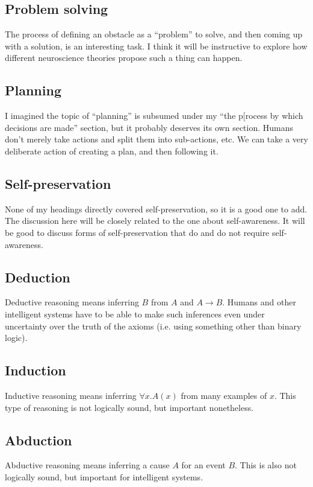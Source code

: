 \documentclass[10pt,a4paper]{article}
\newcommand{\nquote}[1]{``{#1}''}
\begin{document}
\subsection{Problem solving}
The process of defining an obstacle as a \nquote{problem} to solve, and then coming up with a solution, is an interesting task. I think it will be instructive to explore how different neuroscience theories propose such a thing can happen.

\subsection{Planning}
I imagined the topic of \nquote{planning} is subsumed under my \nquote{the p[rocess by which decisions are made} section, but it probably deserves its own section. Humans don't merely take actions and split them into sub-actions, etc. We can take a very deliberate action of creating a plan, and then following it.

\subsection{Self-preservation}
None of my headings directly covered self-preservation, so it is a good one to add. The discussion here will be closely related to the one about self-awareness. It will be good to discuss forms of self-preservation that do and do not require self-awareness.

\subsection{Deduction}
Deductive reasoning means inferring $B$ from $A$ and $A \to B$. Humans and other intelligent systems have to be able to make such inferences even under uncertainty over the truth of the axioms (i.e. using something other than binary logic).

\subsection{Induction}
Inductive reasoning means inferring $\forall x. A(x)$ from many examples of $x$. This type of reasoning is not logically sound, but important nonetheless.

\subsection{Abduction}
Abductive reasoning means inferring a cause $A$ for an event $B$. This is also not logically sound, but important for intelligent systems.


\end{document}
